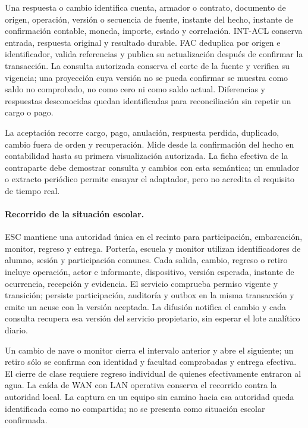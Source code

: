 Una respuesta o cambio identifica cuenta, armador o contrato, documento de origen, operación, versión o secuencia de fuente, instante del hecho, instante de confirmación contable, moneda, importe, estado y correlación. INT-ACL conserva entrada, respuesta original y resultado durable. FAC deduplica por origen e identificador, valida referencias y publica su actualización después de confirmar la transacción. La consulta autorizada conserva el corte de la fuente y verifica su vigencia; una proyección cuya versión no se pueda confirmar se muestra como saldo no comprobado, no como cero ni como saldo actual. Diferencias y respuestas desconocidas quedan identificadas para reconciliación sin repetir un cargo o pago.

La aceptación recorre cargo, pago, anulación, respuesta perdida, duplicado, cambio fuera de orden y recuperación. Mide desde la confirmación del hecho en contabilidad hasta su primera visualización autorizada. La ficha efectiva de la contraparte debe demostrar consulta y cambios con esta semántica; un emulador o extracto periódico permite ensayar el adaptador, pero no acredita el requisito de tiempo real.

\paragraph{Recorrido de la situación escolar.}
ESC mantiene una autoridad única en el recinto para participación, embarcación, monitor, regreso y entrega. Portería, escuela y monitor utilizan identificadores de alumno, sesión y participación comunes. Cada salida, cambio, regreso o retiro incluye operación, actor e informante, dispositivo, versión esperada, instante de ocurrencia, recepción y evidencia. El servicio comprueba permiso vigente y transición; persiste participación, auditoría y outbox en la misma transacción y emite un acuse con la versión aceptada. La difusión notifica el cambio y cada consulta recupera esa versión del servicio propietario, sin esperar el lote analítico diario.

Un cambio de nave o monitor cierra el intervalo anterior y abre el siguiente; un retiro sólo se confirma con identidad y facultad comprobadas y entrega efectiva. El cierre de clase requiere regreso individual de quienes efectivamente entraron al agua. La caída de WAN con LAN operativa conserva el recorrido contra la autoridad local. La captura en un equipo sin camino hacia esa autoridad queda identificada como no compartida; no se presenta como situación escolar confirmada.

